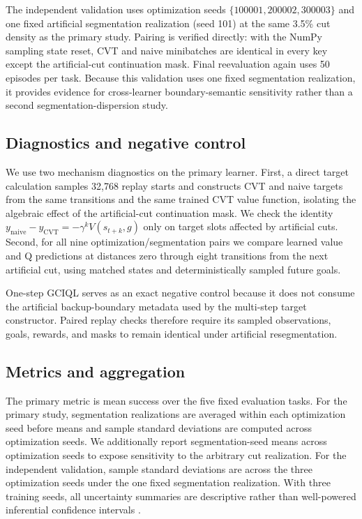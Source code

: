 The independent validation uses optimization seeds $\{100001,200002,300003\}$ and one fixed artificial segmentation realization (seed 101) at the same 3.5\% cut density as the primary study. Pairing is verified directly: with the NumPy sampling state reset, CVT and naive minibatches are identical in every key except the artificial-cut continuation mask. Final reevaluation again uses 50 episodes per task. Because this validation uses one fixed segmentation realization, it provides evidence for cross-learner boundary-semantic sensitivity rather than a second segmentation-dispersion study.

\subsection{Diagnostics and negative control}

We use two mechanism diagnostics on the primary learner. First, a direct target calculation samples 32,768 replay starts and constructs CVT and naive targets from the same transitions and the same trained CVT value function, isolating the algebraic effect of the artificial-cut continuation mask. We check the identity
$y_{\mathrm{naive}}-y_{\mathrm{CVT}}=-\gamma^kV(s_{t+k},g)$
only on target slots affected by artificial cuts. Second, for all nine optimization/segmentation pairs we compare learned value and Q predictions at distances zero through eight transitions from the next artificial cut, using matched states and deterministically sampled future goals.

One-step GCIQL serves as an exact negative control because it does not consume the artificial backup-boundary metadata used by the multi-step target constructor. Paired replay checks therefore require its sampled observations, goals, rewards, and masks to remain identical under artificial resegmentation.

\subsection{Metrics and aggregation}

The primary metric is mean success over the five fixed evaluation tasks. For the primary study, segmentation realizations are averaged within each optimization seed before means and sample standard deviations are computed across optimization seeds. We additionally report segmentation-seed means across optimization seeds to expose sensitivity to the arbitrary cut realization. For the independent validation, sample standard deviations are across the three optimization seeds under the one fixed segmentation realization. With three training seeds, all uncertainty summaries are descriptive rather than well-powered inferential confidence intervals \cite{agarwal2021statistical}.
